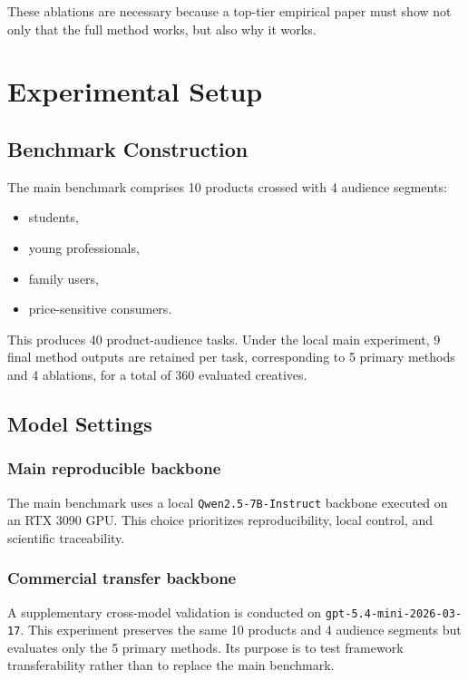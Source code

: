 \documentclass[preprint,12pt]{elsarticle}
\begin{document}
These ablations are necessary because a top-tier empirical paper must show not only that the full method works, but also why it works.

\section{Experimental Setup}

\subsection{Benchmark Construction}

The main benchmark comprises 10 products crossed with 4 audience segments:
\begin{itemize}[leftmargin=1.5em]
    \item students,
    \item young professionals,
    \item family users,
    \item price-sensitive consumers.
\end{itemize}

This produces 40 product-audience tasks. Under the local main experiment, 9 final method outputs are retained per task, corresponding to 5 primary methods and 4 ablations, for a total of 360 evaluated creatives.

\subsection{Model Settings}

\subsubsection{Main reproducible backbone}

The main benchmark uses a local \texttt{Qwen2.5-7B-Instruct} backbone executed on an RTX 3090 GPU. This choice prioritizes reproducibility, local control, and scientific traceability.

\subsubsection{Commercial transfer backbone}

A supplementary cross-model validation is conducted on \texttt{gpt-5.4-mini-2026-03-17}. This experiment preserves the same 10 products and 4 audience segments but evaluates only the 5 primary methods. Its purpose is to test framework transferability rather than to replace the main benchmark.
\end{document}
